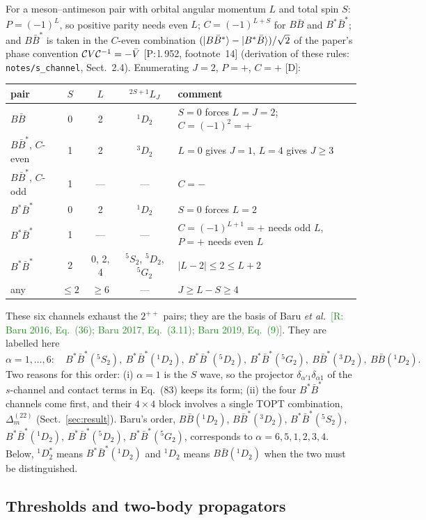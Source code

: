 \documentclass[11pt,a4paper]{article}
\newcommand{\tagP}[1]{\textcolor{blue!65!black}{\textsf{\small[P:\,#1]}}}
\newcommand{\tagR}[1]{\textcolor{ForestGreen}{\textsf{\small[R:\,#1]}}}
\newcommand{\tagD}{\textcolor{orange!85!black}{\textsf{\small[D]}}}
\newcommand{\BB}{B\bar B}
\newcommand{\BBst}{B\bar B^*}
\newcommand{\BstBst}{B^*\bar B^*}
\newcommand{\D}[2]{\Delta^{(#1)}_{#2}}
\begin{document}
For a meson--antimeson pair with orbital angular momentum $L$ and total spin $S$: $P=(-1)^L$, so positive parity needs even $L$; $C=(-1)^{L+S}$ for $\BB$ and $\BstBst$; and $\BBst$ is taken in the $C$-even combination $(\ket{\BBst}-\ket{B^*\bar B})/\sqrt2$ of the paper's phase convention ${\cal C}V{\cal C}^{-1}=-\bar V$ \tagP{l.\,952, footnote~14} (derivation of these rules: \texttt{notes/s\_channel}, Sect.~2.4). Enumerating $J=2$, $P=+$, $C=+$ \tagD:
\begin{center}
\small
\begin{tabular}{lcccl}
\toprule
pair & $S$ & $L$ & $^{2S+1}L_J$ & comment\\
\midrule
$\BB$ & 0 & 2 & $^1D_2$ & $S=0$ forces $L=J=2$; $C=(-1)^2=+$\\
$\BBst$, $C$-even & 1 & 2 & $^3D_2$ & $L=0$ gives $J=1$, $L=4$ gives $J\ge3$\\
$\BBst$, $C$-odd & 1 & --- & --- & $C=-$\\
$\BstBst$ & 0 & 2 & $^1D_2$ & $S=0$ forces $L=2$\\
$\BstBst$ & 1 & --- & --- & $C=(-1)^{L+1}=+$ needs odd $L$, $P=+$ needs even $L$\\
$\BstBst$ & 2 & 0, 2, 4 & $^5S_2$, $^5D_2$, $^5G_2$ & $|L-2|\le2\le L+2$\\
any & $\le2$ & $\ge6$ & --- & $J\ge L-S\ge4$\\
\bottomrule
\end{tabular}
\end{center}
These six channels exhaust the $2^{++}$ pairs; they are the basis of Baru \emph{et al.}\ \tagR{Baru 2016, Eq.~(36); Baru 2017, Eq.~(3.11); Baru 2019, Eq.~(9)}. They are labelled here
\begin{equation}
\alpha=1,\dots,6:\quad
\BstBst(^5S_2),\ \BstBst(^1D_2),\ \BstBst(^5D_2),\ \BstBst(^5G_2),\ \BBst(^3D_2),\ \BB(^1D_2).
\label{eq:channels}
\end{equation}
Two reasons for this order: (i) $\alpha=1$ is the $S$ wave, so the projector $\delta_{\alpha'1}\delta_{\alpha1}$ of the $s$-channel and contact terms in Eq.~(83) keeps its form; (ii) the four $\BstBst$ channels come first, and their $4\times4$ block involves a single TOPT combination, $\D{22}{m}$ (Sect.~\ref{sec:result}). Baru's order, $\BB(^1D_2)$, $\BBst(^3D_2)$, $\BstBst(^5S_2)$, $\BstBst(^1D_2)$, $\BstBst(^5D_2)$, $\BstBst(^5G_2)$, corresponds to $\alpha=6,5,1,2,3,4$. Below, $^1D_2^*$ means $\BstBst(^1D_2)$ and $^1D_2$ means $\BB(^1D_2)$ when the two must be distinguished.

\subsection{Thresholds and two-body propagators}
\label{sec:kin}
\end{document}

